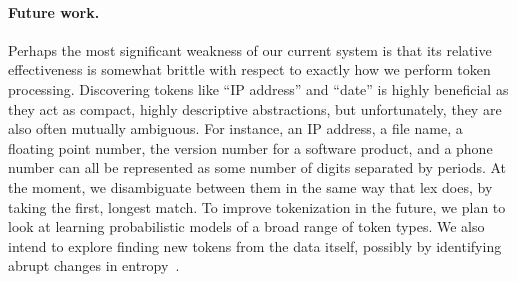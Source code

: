 \paragraph*{Future work.}  Perhaps the most significant weakness of our current
system is that its relative effectiveness is somewhat brittle with respect to
exactly how we perform token processing.
Discovering tokens like ``IP address'' and ``date'' is highly beneficial
as they act as compact, highly 
descriptive abstractions, but unfortunately, they are also often 
mutually ambiguous.  For instance, an IP address, a file name, a 
floating point number, the version number for a software product,
and a phone number can all be represented as some number of digits 
separated by periods.  At the moment, we disambiguate between them 
in the same way that lex does, by taking the first, longest match. 
To improve tokenization in the future, we plan to look at learning
probabilistic models of a broad range of token types.  We also
intend to explore finding new tokens from the data itself,
possibly by identifying abrupt changes in entropy~\cite{hutchens98finding}.




